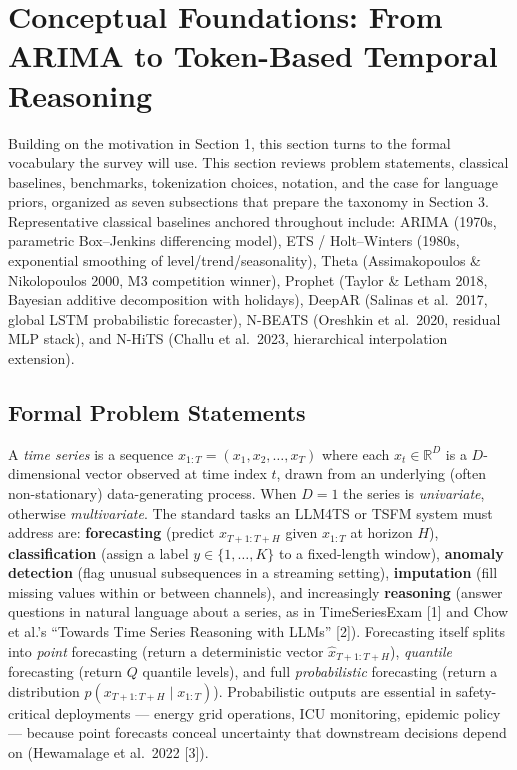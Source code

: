 \section{Conceptual Foundations: From ARIMA to Token-Based Temporal Reasoning}\label{conceptual-foundations-from-arima-to-token-based-temporal-reasoning}

Building on the motivation in Section 1, this section turns to the formal vocabulary the survey will use. This section reviews problem statements, classical baselines, benchmarks, tokenization choices, notation, and the case for language priors, organized as seven subsections that prepare the taxonomy in Section 3. Representative classical baselines anchored throughout include: ARIMA (1970s, parametric Box--Jenkins differencing model), ETS / Holt--Winters (1980s, exponential smoothing of level/trend/seasonality), Theta (Assimakopoulos \& Nikolopoulos 2000, M3 competition winner), Prophet (Taylor \& Letham 2018, Bayesian additive decomposition with holidays), DeepAR (Salinas et al.~2017, global LSTM probabilistic forecaster), N-BEATS (Oreshkin et al.~2020, residual MLP stack), and N-HiTS (Challu et al.~2023, hierarchical interpolation extension).

\subsection{Formal Problem Statements}\label{formal-problem-statements}

A \emph{time series} is a sequence \(x_{1:T} = (x_1, x_2, \ldots, x_T)\) where each \(x_t \in \mathbb{R}^D\) is a \(D\)-dimensional vector observed at time index \(t\), drawn from an underlying (often non-stationary) data-generating process. When \(D=1\) the series is \emph{univariate}, otherwise \emph{multivariate}. The standard tasks an LLM4TS or TSFM system must address are: \textbf{forecasting} (predict \(x_{T+1:T+H}\) given \(x_{1:T}\) at horizon \(H\)), \textbf{classification} (assign a label \(y \in \{1,\ldots,K\}\) to a fixed-length window), \textbf{anomaly detection} (flag unusual subsequences in a streaming setting), \textbf{imputation} (fill missing values within or between channels), and increasingly \textbf{reasoning} (answer questions in natural language about a series, as in TimeSeriesExam {[}1{]} and Chow et al.'s ``Towards Time Series Reasoning with LLMs'' {[}2{]}). Forecasting itself splits into \emph{point} forecasting (return a deterministic vector \(\hat{x}_{T+1:T+H}\)), \emph{quantile} forecasting (return \(Q\) quantile levels), and full \emph{probabilistic} forecasting (return a distribution \(p(x_{T+1:T+H} \mid x_{1:T})\)). Probabilistic outputs are essential in safety-critical deployments --- energy grid operations, ICU monitoring, epidemic policy --- because point forecasts conceal uncertainty that downstream decisions depend on (Hewamalage et al.~2022 {[}3{]}).

